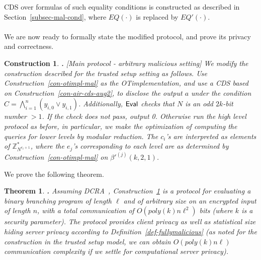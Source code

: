 \documentclass{article}
\newtheorem{THEOREM}{Theorem}[section]
\newenvironment{theorem}{\begin{THEOREM} \hspace{-.85em} {\bf .} \rm}%
	{\end{THEOREM}}
\newtheorem{CONSTRUCTION}{Construction}[section]
\newenvironment{construction}{\begin{CONSTRUCTION} \hspace{-.85em} {\bf .} \rm}%
	{\end{CONSTRUCTION}}
\newcommand{\eval}{{\sf Eval}}
\newcommand{\ot}{\mbox{OT}\;}
\newcommand{\U}[1]{\mathbb{Z}_{#1}^*}
\begin{document}
CDS over formulas of such equality conditions is constructed as described in Section~\ref{subsec-mal-cond},
where $EQ(\cdot)$ is replaced by $EQ'(\cdot)$.
\paragraph{}We are now ready to formally state the modified protocol, and prove its privacy and correctness.
\begin{construction}[Main protocol - arbitrary malicious setting]
  \label{con-main-fullymal}
  We modify the construction described for the trusted setup setting as follows.
  Use Construction~\ref{con-otimpl-mal} as the \ot implementation,
  and use a CDS based on Construction~\ref{con-air-cds-aug2}, to disclose the output $a$ under the condition $C=\bigwedge^n_{i=1}(y_{i,0}\vee y_{i,1})$.
  Additionally, $\eval$ checks that $N$ is an odd $2k$-bit number $>1$. If the check does not pass, output 0. Otherwise run the high level protocol as before, in particular, we make the optimization of computing the queries for lower levels by modular reduction. The $c_i$'s are interpreted as elements of $\U{N^{e_{\ell}+1}}$, where the $e_j$'s corresponding to each level are as determined by Construction~\ref{con-otimpl-mal} on $\beta'^{(j)}(k,2,1)$.
\end{construction}
We prove the following theorem.
\begin{theorem}
  Assuming DCRA~\cite{DJ01}, Construction~\ref{con-main-fullymal} is a protocol for evaluating a
  binary branching program of length $\ell$ and of arbitrary size on
  an encrypted input of length $n$, with a total communication of
  $O(poly(k)n\ell^2)$ bits (where $k$ is a security parameter). The protocol
  provides client privacy as well as statistical size hiding server privacy
  according to Definition~\ref{def-fullymalicious} (as noted for the construction in the trusted setup model, we can obtain $O(poly(k)n\ell)$ communication complexity if we settle for computational server privacy).
\end{theorem}
\end{document}
